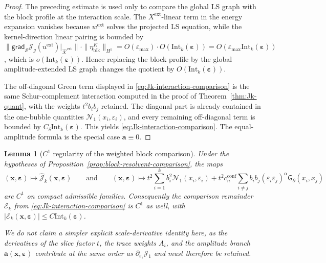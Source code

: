 \documentclass[11pt,reqno,a4paper]{amsart}
\numberwithin{equation}{section}
\theoremstyle{plain}
\newtheorem{lemma}[theorem]{Lemma}
\theoremstyle{remark}
\theoremstyle{plain}
\begin{document}
\begin{proof}
The preceding estimate is used only to compare the global LS graph with the block
profile at the interaction scale.  The $X^{\mathrm{ext}}$-linear term in the energy
expansion vanishes because $w^{\mathrm{ext}}$ solves the projected LS equation, while
the kernel-direction linear pairing is bounded by
$\|\mathsf{grad}_{\mathcal S}\mathcal J_g(u^{\mathrm{ext}})\big|_{\widehat{\mathcal K}^{\mathrm{ext}}}\|
\cdot\|\eta_{\mathrm{blk}}^K\|_{H^1}
=O(\varepsilon_{\max})\cdot O(\mathrm{Int}_k(\boldsymbol\varepsilon))
=O(\varepsilon_{\max}\mathrm{Int}_k(\boldsymbol\varepsilon))$,
which is $o(\mathrm{Int}_k(\boldsymbol\varepsilon))$.  Hence replacing the block profile
by the global amplitude-extended LS graph changes the quotient by
$O(\mathrm{Int}_k(\boldsymbol\varepsilon))$.

The off-diagonal Green term displayed in
\eqref{eq:Jk-interaction-comparison} is the same Schur-complement interaction computed
in the proof of Theorem~\ref{thm:Jk-quant}, with the weights $t^2 b_i b_j$ retained.
The diagonal part is already contained in the one-bubble quantities
$\mathcal N_1(x_i,\varepsilon_i)$, and every remaining off-diagonal term is bounded by
$C_\delta\mathrm{Int}_k(\boldsymbol\varepsilon)$.
This yields \eqref{eq:Jk-interaction-comparison}.
The equal-amplitude formula is the special case $\mathbf a\equiv0$.
\end{proof}

\begin{lemma}[$C^1$ regularity of the weighted block comparison]
\label{lem:C1-block-resolvent}
Under the hypotheses of Proposition~\ref{prop:block-resolvent-comparison},
the maps
\[
(\mathbf x,\boldsymbol\varepsilon)\longmapsto \hat{\mathcal J}_k(\mathbf x,\boldsymbol\varepsilon)
\qquad\text{and}\qquad
(\mathbf x,\boldsymbol\varepsilon)\longmapsto
t^2\sum_{i=1}^k b_i^2\mathcal N_1(x_i,\varepsilon_i)
+t^2 c_n^{\mathrm{conf}}\sum_{i\neq j}
 b_i b_j (\varepsilon_i\varepsilon_j)^\alpha\mathsf G_\partial(x_i,x_j)
\]
are $C^1$ on compact admissible families.
Consequently the comparison remainder
$\mathcal E_k$ from \eqref{eq:Jk-interaction-comparison}
is $C^1$ as well, with
$|\mathcal E_k(\mathbf x,\boldsymbol\varepsilon)|
\le C\mathrm{Int}_k(\boldsymbol\varepsilon)$.

We do not claim a simpler explicit scale-derivative identity here, as the derivatives of the slice factor $t$, the trace weights $A_i$, and the amplitude branch $\mathbf a(\mathbf x,\boldsymbol\varepsilon)$ contribute at the same order as $\partial_{\varepsilon_i}\mathcal J_1$ and must therefore be retained.
\end{lemma}
\end{document}
